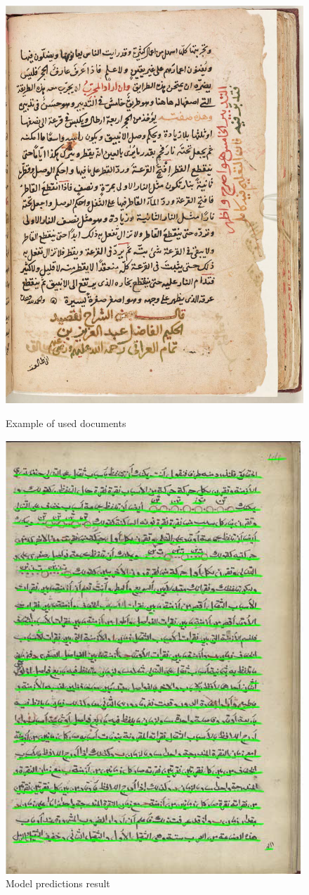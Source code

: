 \begin{figure}[H]
    \centering
    \begin{minipage}{0.50\linewidth}
        \centering
        \includegraphics[width=0.7\linewidth, height=0.9\linewidth]{images/example.png} %
        \caption{Example of used documents}
        \label{fig:example1}
    \end{minipage}\hfill
    \begin{minipage}{0.50\linewidth}
        \centering
        \includegraphics[width=0.7\linewidth, height=0.9\linewidth]{images/example2.png} %
        \caption{Model predictions result}
        \label{fig:example2}
    \end{minipage}
\end{figure}

